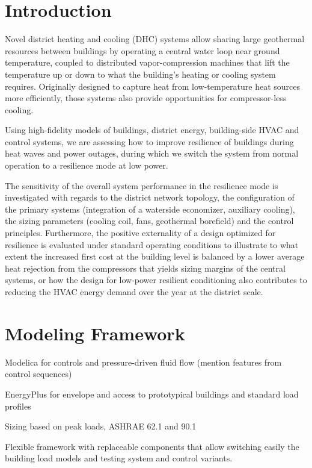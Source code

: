\section{Introduction} \label{sec:intro}

Novel district heating and cooling (DHC) systems allow sharing large geothermal resources between buildings by operating a central water loop near ground temperature, coupled to distributed vapor-compression machines that lift the temperature up or down to what the building’s heating or cooling system requires.
Originally designed to capture heat from low-temperature heat sources more efficiently, those systems also provide opportunities for compressor-less cooling.

Using high-fidelity models of buildings, district energy, building-side HVAC and control systems, we are assessing how to improve resilience of buildings during heat waves and power outages, during which we switch the system from normal operation to a resilience mode at low power.

The sensitivity of the overall system performance in the resilience mode is investigated with regards to the district network topology, the configuration of the primary systems (integration of a waterside economizer, auxiliary cooling), the sizing parameters (cooling coil, fans, geothermal borefield) and the control principles.
Furthermore, the positive externality of a design optimized for resilience is evaluated under standard operating conditions to illustrate to what extent the increased first cost at the building level is balanced by a lower average heat rejection from the compressors that yields sizing margins of the central systems, or how the design for low-power resilient conditioning also contributes to reducing the HVAC energy demand over the year at the district scale.


\section{Modeling Framework} \label{sec:modeling}

Modelica for controls and pressure-driven fluid flow (mention features from control sequences)

EnergyPlus for envelope and access to prototypical buildings and standard load profiles

Sizing based on peak loads, ASHRAE 62.1 and 90.1

Flexible framework with replaceable components that allow switching easily the building load models and testing system and control variants.


